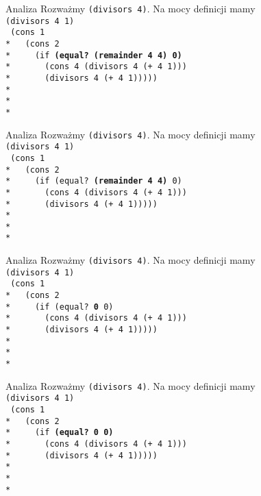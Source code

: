 \begin{frame}{Analiza}
  Rozważmy \texttt{(divisors 4)}. Na mocy definicji mamy\\
  \texttt{(divisors 4 1)}\\
  \texttt{
(cons 1 \\*
\ \ (cons 2 \\*
\ \ \ \ (if \textbf{(equal?\ (remainder 4 4) 0)}\\*
\ \ \ \ \ \ (cons 4 (divisors 4 (+ 4 1)))\\*
\ \ \ \ \ \ (divisors 4 (+ 4 1)))))\\*
\ \\*
\ \\*
  }
\end{frame}

\begin{frame}{Analiza}
  Rozważmy \texttt{(divisors 4)}. Na mocy definicji mamy\\
  \texttt{(divisors 4 1)}\\
  \texttt{
(cons 1 \\*
\ \ (cons 2 \\*
\ \ \ \ (if (equal?\ \textbf{(remainder 4 4)} 0)\\*
\ \ \ \ \ \ (cons 4 (divisors 4 (+ 4 1)))\\*
\ \ \ \ \ \ (divisors 4 (+ 4 1)))))\\*
\ \\*
\ \\*
  }
\end{frame}

\begin{frame}{Analiza}
  Rozważmy \texttt{(divisors 4)}. Na mocy definicji mamy\\
  \texttt{(divisors 4 1)}\\
  \texttt{
(cons 1 \\*
\ \ (cons 2 \\*
\ \ \ \ (if (equal?\ \textbf{0} 0)\\*
\ \ \ \ \ \ (cons 4 (divisors 4 (+ 4 1)))\\*
\ \ \ \ \ \ (divisors 4 (+ 4 1)))))\\*
\ \\*
\ \\*
  }
\end{frame}

\begin{frame}{Analiza}
  Rozważmy \texttt{(divisors 4)}. Na mocy definicji mamy\\
  \texttt{(divisors 4 1)}\\
  \texttt{
(cons 1 \\*
\ \ (cons 2 \\*
\ \ \ \ (if \textbf{(equal?\ 0 0)}\\*
\ \ \ \ \ \ (cons 4 (divisors 4 (+ 4 1)))\\*
\ \ \ \ \ \ (divisors 4 (+ 4 1)))))\\*
\ \\*
\ \\*
  }
\end{frame}

